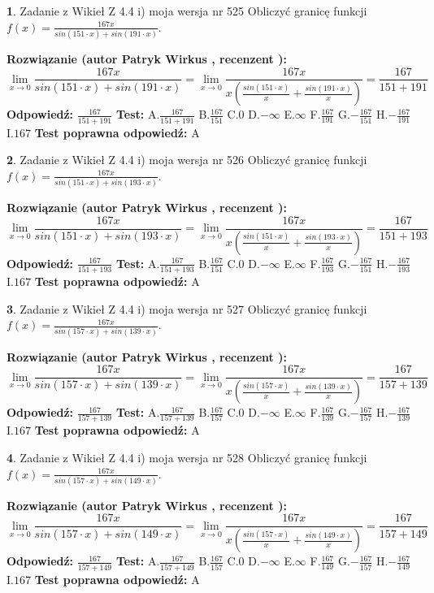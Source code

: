 \documentclass[12pt, a4paper]{article}
\theoremstyle{definition} %
\newtheorem{zad}{}
\newcommand{\zadStart}[1]{\begin{zad}#1\newline}
\newcommand{\zadStop}{\end{zad}}
\newcommand{\rozwStart}[2]{\noindent \textbf{Rozwiązanie (autor #1 , recenzent #2): }\newline}
\newcommand{\rozwStop}{\newline}
\newcommand{\odpStart}{\noindent \textbf{Odpowiedź:}\newline}
\newcommand{\odpStop}{\newline}
\newcommand{\testStart}{\noindent \textbf{Test:}\newline}
\newcommand{\testStop}{\newline}
\newcommand{\kluczStart}{\noindent \textbf{Test poprawna odpowiedź:}\newline}
\newcommand{\kluczStop}{\newline}
\begin{document}
\zadStart{Zadanie z Wikieł Z 4.4 i) moja wersja nr 525}
Obliczyć granicę funkcji $f(x)=\frac{167x}{sin(151\cdot x) +sin(191\cdot x)}$.
\zadStop
\rozwStart{Patryk Wirkus}{}
$$\lim\limits_{x\to 0}\frac{167x}{sin(151\cdot x) +sin(191\cdot x)}=\lim\limits_{x\to 0}\frac{167x}{x(\frac{sin(151\cdot x)}{x}+\frac{sin(191\cdot x)}{x})}=\frac{167}{151+191}$$
\rozwStop
\odpStart
$\frac{167}{151+191}$
\odpStop
\testStart
A.$\frac{167}{151+191}$
B.$\frac{167}{151}$
C.$0$
D.$-\infty$
E.$\infty$
F.$\frac{167}{191}$
G.$-\frac{167}{151}$
H.$-\frac{167}{191}$
I.$167$
\testStop
\kluczStart
A
\kluczStop



\zadStart{Zadanie z Wikieł Z 4.4 i) moja wersja nr 526}
Obliczyć granicę funkcji $f(x)=\frac{167x}{sin(151\cdot x) +sin(193\cdot x)}$.
\zadStop
\rozwStart{Patryk Wirkus}{}
$$\lim\limits_{x\to 0}\frac{167x}{sin(151\cdot x) +sin(193\cdot x)}=\lim\limits_{x\to 0}\frac{167x}{x(\frac{sin(151\cdot x)}{x}+\frac{sin(193\cdot x)}{x})}=\frac{167}{151+193}$$
\rozwStop
\odpStart
$\frac{167}{151+193}$
\odpStop
\testStart
A.$\frac{167}{151+193}$
B.$\frac{167}{151}$
C.$0$
D.$-\infty$
E.$\infty$
F.$\frac{167}{193}$
G.$-\frac{167}{151}$
H.$-\frac{167}{193}$
I.$167$
\testStop
\kluczStart
A
\kluczStop



\zadStart{Zadanie z Wikieł Z 4.4 i) moja wersja nr 527}
Obliczyć granicę funkcji $f(x)=\frac{167x}{sin(157\cdot x) +sin(139\cdot x)}$.
\zadStop
\rozwStart{Patryk Wirkus}{}
$$\lim\limits_{x\to 0}\frac{167x}{sin(157\cdot x) +sin(139\cdot x)}=\lim\limits_{x\to 0}\frac{167x}{x(\frac{sin(157\cdot x)}{x}+\frac{sin(139\cdot x)}{x})}=\frac{167}{157+139}$$
\rozwStop
\odpStart
$\frac{167}{157+139}$
\odpStop
\testStart
A.$\frac{167}{157+139}$
B.$\frac{167}{157}$
C.$0$
D.$-\infty$
E.$\infty$
F.$\frac{167}{139}$
G.$-\frac{167}{157}$
H.$-\frac{167}{139}$
I.$167$
\testStop
\kluczStart
A
\kluczStop



\zadStart{Zadanie z Wikieł Z 4.4 i) moja wersja nr 528}
Obliczyć granicę funkcji $f(x)=\frac{167x}{sin(157\cdot x) +sin(149\cdot x)}$.
\zadStop
\rozwStart{Patryk Wirkus}{}
$$\lim\limits_{x\to 0}\frac{167x}{sin(157\cdot x) +sin(149\cdot x)}=\lim\limits_{x\to 0}\frac{167x}{x(\frac{sin(157\cdot x)}{x}+\frac{sin(149\cdot x)}{x})}=\frac{167}{157+149}$$
\rozwStop
\odpStart
$\frac{167}{157+149}$
\odpStop
\testStart
A.$\frac{167}{157+149}$
B.$\frac{167}{157}$
C.$0$
D.$-\infty$
E.$\infty$
F.$\frac{167}{149}$
G.$-\frac{167}{157}$
H.$-\frac{167}{149}$
I.$167$
\testStop
\kluczStart
A
\kluczStop
\end{document}
